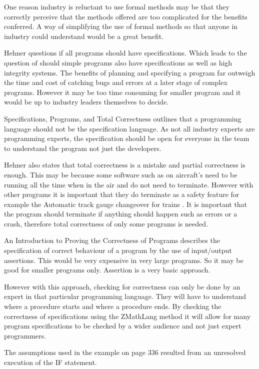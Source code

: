 One reason industry is reluctant to use formal methods may be that they correctly perceive that the methods offered are too complicated for the benefits conferred. A way of simplifying the use of formal methods so that anyone in industry could understand would be a great benefit.

Hehner questions if all programs should have specifications. Which leads to the question of should simple programs also have specifications as well as high integrity systems. The benefits of planning and specifying a program far outweigh the time and cost of catching bugs and errors at a later stage \cite{planning} of complex programs. However it may be too time consuming for smaller program and it would be up to industry leaders themselves to decide.

Specifications, Programs, and Total Correctness \cite{hehner99} outlines that a programming language should not be the specification language. As not all industry experts are programming experts, the specification should be open for everyone in the team to understand the program not just the developers.

Hehner also states that total correctness is a mistake and partial correctness is enough. This may be because some software such as on aircraft's need to be running all the time when in the air and do not need to terminate. However with other programs it is important that they do terminate as a safety feature for example the Automatic track gauge changeover for trains \cite{automatictrain}. It is important that the program should terminate if anything should happen such as errors or a crash, therefore total correctness of only some programs is needed.

An Introduction to Proving the Correctness of Programs \cite{hantler} describes the specification of correct behaviour of a program by the use of input/output assertions. This would be very expensive in very large programs. So it may be good for smaller programs only. Assertion is a very basic approach.

However with this approach, checking for correctness can only be done by an expert in that particular programming language. They will have to understand where a procedure starts and where a procedure ends. By checking the correctness of specifications using the ZMathLang method it will allow for many program specifications to be checked by a wider audience and not just expert programmers.

The assumptions used in the example on page 336 \cite{hantler} resulted from an unresolved execution of the IF statement.

